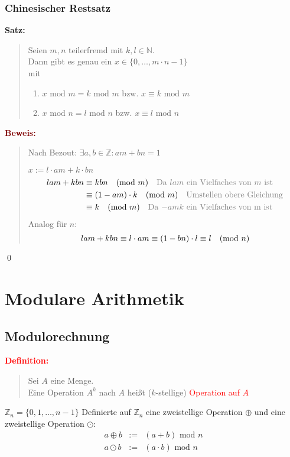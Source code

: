 \documentclass{article}
\newcommand{\mesp}{\phantom{\hspace{10px}}}
\newcommand{\red}[1]{\textcolor{red}{#1}}
\newcommand{\gray}[1]{\textcolor{gray}{#1}}
\newcommand{\dgr}[1]{\textcolor{dgr}{#1}}
\newcommand{\maroon}[1]{\textcolor{maroon}{#1}}
\newcommand{\de}[1]{\red{\textbf{Definition: }}\begin{quote}#1\end{quote}}
\newcommand{\se}[1]{\dgr{\textbf{Satz: }}\begin{quote}#1\end{quote}}
\newcommand{\pr}[1]{\maroon{\textbf{Beweis: }}\begin{quote}#1\end{quote}\qed}
\newcommand{\N}{\mathbb{N}}
\newcommand{\Z}{\mathbb{Z}}
\renewcommand{\mod}{\text{ mod }}
\begin{document}
\newpage
\subsubsection{Chinesischer Restsatz}
\se{
    Seien $m,n$ teilerfremd mit $k,l \in \N$.\\
    Dann gibt es genau ein $x \in \{0, \dots, m \cdot n - 1\}$\\
    mit \begin{enumerate}
        \item $x \mod m = k \mod m$ bzw. $x \equiv k \mod m$
        \item $x \mod n = l \mod n$ bzw. $x \equiv l \mod n$
    \end{enumerate} 
}
\pr{
    Nach Bezout: $\exists a,b \in \Z: am + bn = 1$

    $x := l \cdot am + k \cdot bn$
    \begin{align*}
        lam + kbn &\equiv kbn \mesp (\text{mod } m) \mesp \text{\gray{Da $lam$ ein Vielfaches von $m$ ist}}\\
        &\equiv (1 - am) \cdot k \mesp (\text{mod } m) \mesp \text{\gray{Umstellen obere Gleichung}}\\
        &\equiv k \mesp (\text{mod } m) \mesp \text{\gray{Da $-amk$ ein Vielfaches von m ist}}\\
    \end{align*}
    Analog für $n$:
    \[
        lam + kbn \equiv l \cdot am \equiv (1-bn) \cdot l \equiv l \mesp (\text{mod } n)
    \]
}

\section{Modulare Arithmetik}

\subsection{Modulorechnung}

\de{
    Sei $A$ eine Menge.\\
    Eine Operation $A^k$ nach $A$ heißt ($k$-stellige) \red{Operation auf $A$}
}
$\Z_n = \{0, 1, \dots, n-1\}$
Definierte auf $\Z_n$ eine zweistellige Operation $\oplus$ und eine zweistellige Operation $\odot$:
\[
    \begin{array}{lcl}
        a \oplus b &:=& (a + b) \mod n\\
        a \odot b &:=& (a \cdot b) \mod n
    \end{array}
\]
\end{document}
